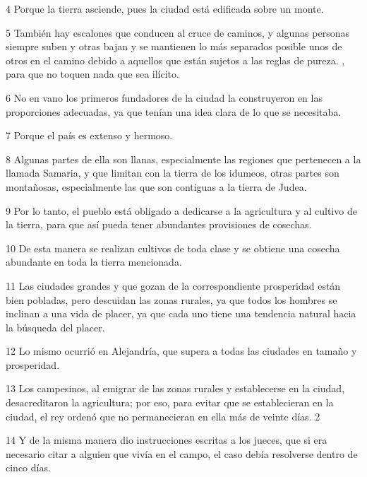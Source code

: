 \par 4 Porque la tierra asciende, pues la ciudad está edificada sobre un monte.

\par 5 También hay escalones que conducen al cruce de caminos, y algunas personas siempre suben y otras bajan y se mantienen lo más separados posible unos de otros en el camino debido a aquellos que están sujetos a las reglas de pureza. , para que no toquen nada que sea ilícito.

\par 6 No en vano los primeros fundadores de la ciudad la construyeron en las proporciones adecuadas, ya que tenían una idea clara de lo que se necesitaba.

\par 7 Porque el país es extenso y hermoso.

\par 8 Algunas partes de ella son llanas, especialmente las regiones que pertenecen a la llamada Samaria, y que limitan con la tierra de los idumeos, otras partes son montañosas, especialmente las que son contiguas a la tierra de Judea.

\par 9 Por lo tanto, el pueblo está obligado a dedicarse a la agricultura y al cultivo de la tierra, para que así pueda tener abundantes provisiones de cosechas.

\par 10 De esta manera se realizan cultivos de toda clase y se obtiene una cosecha abundante en toda la tierra mencionada.

\par 11 Las ciudades grandes y que gozan de la correspondiente prosperidad están bien pobladas, pero descuidan las zonas rurales, ya que todos los hombres se inclinan a una vida de placer, ya que cada uno tiene una tendencia natural hacia la búsqueda del placer.

\par 12 Lo mismo ocurrió en Alejandría, que supera a todas las ciudades en tamaño y prosperidad.

\par 13 Los campesinos, al emigrar de las zonas rurales y establecerse en la ciudad, desacreditaron la agricultura; por eso, para evitar que se establecieran en la ciudad, el rey ordenó que no permanecieran en ella más de veinte días. 2

\par 14 Y de la misma manera dio instrucciones escritas a los jueces, que si era necesario citar a alguien que vivía en el campo, el caso debía resolverse dentro de cinco días.


